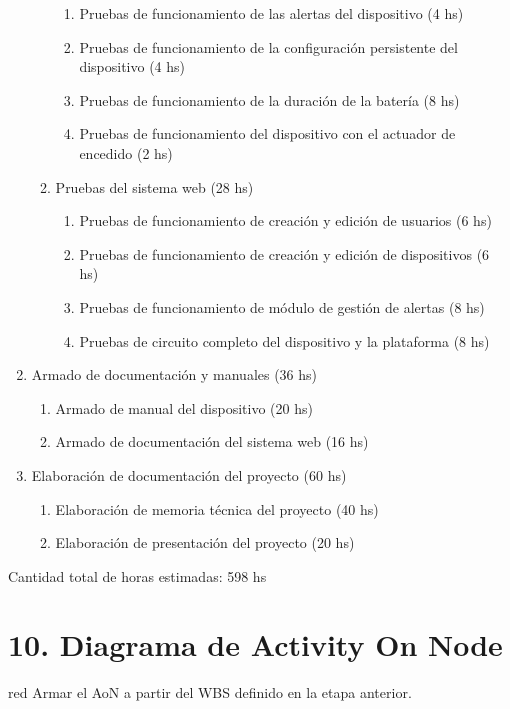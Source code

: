 \documentclass[
11pt, %
]{charter}
\begin{document}
\begin{enumerate}
\begin{enumerate}
\begin{enumerate}
	    \item Pruebas de funcionamiento de las alertas del dispositivo (4 hs)
	    \item Pruebas de funcionamiento de la configuración persistente del dispositivo (4 hs)	
	    \item Pruebas de funcionamiento de la duración de la batería (8 hs)
	    \item Pruebas de funcionamiento del dispositivo con el actuador de encedido (2 hs)
	    \end{enumerate}
	\item Pruebas del sistema web (28 hs)
	    \begin{enumerate}
	    \item Pruebas de funcionamiento de creación y edición de usuarios (6 hs)
	    \item Pruebas de funcionamiento de creación y edición de dispositivos (6 hs)
	    \item Pruebas de funcionamiento de módulo de gestión de alertas (8 hs)
	    \item Pruebas de circuito completo del dispositivo y la plataforma (8 hs)
	    \end{enumerate}
	\end{enumerate}
\item Armado de documentación y manuales (36 hs)
	\begin{enumerate}
	\item Armado de manual del dispositivo (20 hs)
	\item Armado de documentación del sistema web (16 hs)
	\end{enumerate}
\item Elaboración de documentación del proyecto (60 hs)
	\begin{enumerate}
	\item Elaboración de memoria técnica del proyecto (40 hs)
	\item Elaboración de presentación del proyecto (20 hs)
	\end{enumerate}
\end{enumerate}

Cantidad total de horas estimadas: 598 hs

\section{10. Diagrama de Activity On Node}
\label{sec:AoN}

\begin{consigna}{red}
Armar el AoN a partir del WBS definido en la etapa anterior. 



\end{consigna}
\end{document}
